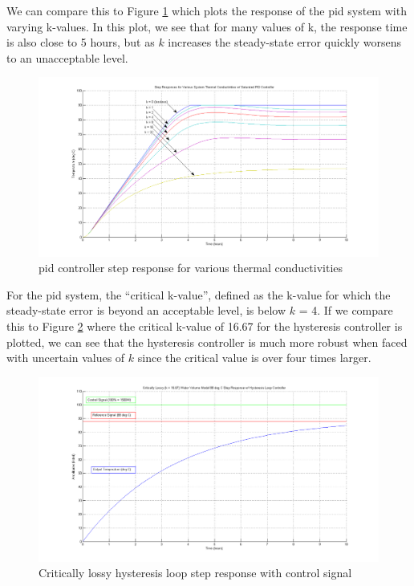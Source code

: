 \documentclass{article}
\begin{document}
We can compare this to Figure \ref{fig:pid-steps-various-k} which plots the response of the \gls{pid} system with varying k-values. In this plot, we see that for many values of k, the response time is also close to 5 hours, but as $k$ increases the steady-state error quickly worsens to an unacceptable level.

\begin{figure}[H]
\begin{center}
\includegraphics[scale=0.35]{pid-steps-various-k.png}
\caption{\gls{pid} controller step response for various thermal conductivities}
\label{fig:pid-steps-various-k}
\end{center}
\end{figure}

For the \gls{pid} system, the ``critical k-value'', defined as the k-value for which the steady-state error is beyond an acceptable level, is below $k$ = 4. If we compare this to Figure \ref{fig:hysteresis-step-critical} where the critical k-value of 16.67 for the hysteresis controller is plotted, we can see that the hysteresis controller is much more robust when faced with uncertain values of $k$ since the critical value is over four times larger.

\begin{figure}[H]
\begin{center}
\includegraphics[scale=0.35]{hysteresis-step-critical.png}
\caption{Critically lossy hysteresis loop step response with control signal}
\label{fig:hysteresis-step-critical}
\end{center}
\end{figure}
\end{document}
